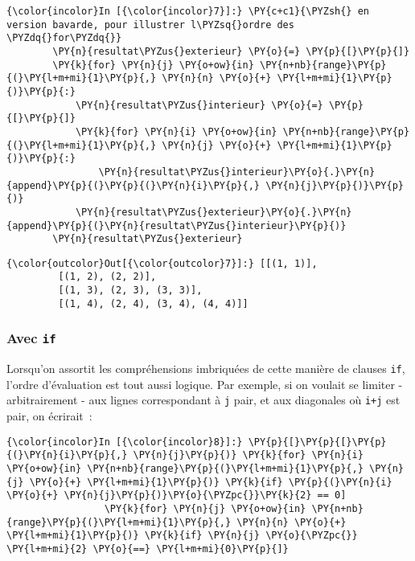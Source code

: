     \begin{Verbatim}[commandchars=\\\{\},frame=single,framerule=0.3mm,rulecolor=\color{cellframecolor}]
{\color{incolor}In [{\color{incolor}7}]:} \PY{c+c1}{\PYZsh{} en version bavarde, pour illustrer l\PYZsq{}ordre des \PYZdq{}for\PYZdq{}}
        \PY{n}{resultat\PYZus{}exterieur} \PY{o}{=} \PY{p}{[}\PY{p}{]}
        \PY{k}{for} \PY{n}{j} \PY{o+ow}{in} \PY{n+nb}{range}\PY{p}{(}\PY{l+m+mi}{1}\PY{p}{,} \PY{n}{n} \PY{o}{+} \PY{l+m+mi}{1}\PY{p}{)}\PY{p}{:}
            \PY{n}{resultat\PYZus{}interieur} \PY{o}{=} \PY{p}{[}\PY{p}{]}
            \PY{k}{for} \PY{n}{i} \PY{o+ow}{in} \PY{n+nb}{range}\PY{p}{(}\PY{l+m+mi}{1}\PY{p}{,} \PY{n}{j} \PY{o}{+} \PY{l+m+mi}{1}\PY{p}{)}\PY{p}{:}
                \PY{n}{resultat\PYZus{}interieur}\PY{o}{.}\PY{n}{append}\PY{p}{(}\PY{p}{(}\PY{n}{i}\PY{p}{,} \PY{n}{j}\PY{p}{)}\PY{p}{)}
            \PY{n}{resultat\PYZus{}exterieur}\PY{o}{.}\PY{n}{append}\PY{p}{(}\PY{n}{resultat\PYZus{}interieur}\PY{p}{)}
        \PY{n}{resultat\PYZus{}exterieur}
\end{Verbatim}


\begin{Verbatim}[commandchars=\\\{\},frame=single,framerule=0.3mm,rulecolor=\color{cellframecolor}]
{\color{outcolor}Out[{\color{outcolor}7}]:} [[(1, 1)],
         [(1, 2), (2, 2)],
         [(1, 3), (2, 3), (3, 3)],
         [(1, 4), (2, 4), (3, 4), (4, 4)]]
\end{Verbatim}
            
    \hypertarget{avec-if}{%
\subsubsection{\texorpdfstring{Avec
\texttt{if}}{Avec if}}\label{avec-if}}

    Lorsqu'on assortit les compréhensions imbriquées de cette manière de
clauses \texttt{if}, l'ordre d'évaluation est tout aussi logique. Par
exemple, si on voulait se limiter - arbitrairement - aux lignes
correspondant à \texttt{j} pair, et aux diagonales où \texttt{i+j} est
pair, on écrirait~:

    \begin{Verbatim}[commandchars=\\\{\},frame=single,framerule=0.3mm,rulecolor=\color{cellframecolor}]
{\color{incolor}In [{\color{incolor}8}]:} \PY{p}{[}\PY{p}{[}\PY{p}{(}\PY{n}{i}\PY{p}{,} \PY{n}{j}\PY{p}{)} \PY{k}{for} \PY{n}{i} \PY{o+ow}{in} \PY{n+nb}{range}\PY{p}{(}\PY{l+m+mi}{1}\PY{p}{,} \PY{n}{j} \PY{o}{+} \PY{l+m+mi}{1}\PY{p}{)} \PY{k}{if} \PY{p}{(}\PY{n}{i} \PY{o}{+} \PY{n}{j}\PY{p}{)}\PY{o}{\PYZpc{}}\PY{k}{2} == 0]
                 \PY{k}{for} \PY{n}{j} \PY{o+ow}{in} \PY{n+nb}{range}\PY{p}{(}\PY{l+m+mi}{1}\PY{p}{,} \PY{n}{n} \PY{o}{+} \PY{l+m+mi}{1}\PY{p}{)} \PY{k}{if} \PY{n}{j} \PY{o}{\PYZpc{}} \PY{l+m+mi}{2} \PY{o}{==} \PY{l+m+mi}{0}\PY{p}{]}
\end{Verbatim}



